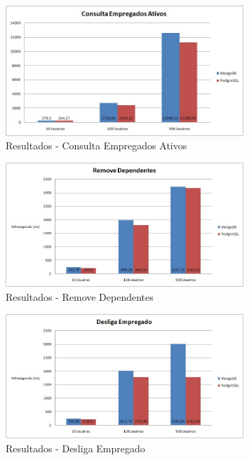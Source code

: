 \begin{figure}[!htbp]
	\begin{center}
		\includegraphics[width=0.8\textwidth]{resultados/consulta_estatistica}
	\end{center}
	\caption{Resultados - Consulta Empregados Ativos}
	\label{fig:resultlistaempregadosativos}
\end{figure}

\begin{figure}[!htbp]
	\begin{center}
		\includegraphics[width=0.8\textwidth]{resultados/remove_dependentes}
	\end{center}
	\caption{Resultados - Remove Dependentes}
	\label{fig:resultremovedependentes}
\end{figure}

\begin{figure}[!htbp]
	\begin{center}
		\includegraphics[width=0.8\textwidth]{resultados/desliga_empregado}
	\end{center}
	\caption{Resultados - Desliga Empregado}
	\label{fig:resultdesliga_empregado}
\end{figure}



